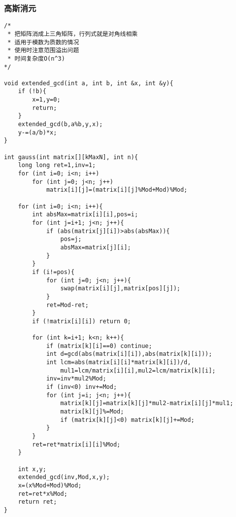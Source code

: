 \subsubsection{高斯消元}
\begin{verbatim}
/*
 * 把矩阵消成上三角矩阵，行列式就是对角线相乘
 * 适用于模数为质数的情况
 * 使用时注意范围溢出问题
 * 时间复杂度O(n^3)
*/

void extended_gcd(int a, int b, int &x, int &y){
    if (!b){
        x=1,y=0;
        return;
    }
    extended_gcd(b,a%b,y,x);
    y-=(a/b)*x;
}

int gauss(int matrix[][kMaxN], int n){
    long long ret=1,inv=1;
    for (int i=0; i<n; i++)
        for (int j=0; j<n; j++)
            matrix[i][j]=(matrix[i][j]%Mod+Mod)%Mod;

    for (int i=0; i<n; i++){
        int absMax=matrix[i][i],pos=i;
        for (int j=i+1; j<n; j++){
            if (abs(matrix[j][i])>abs(absMax)){
                pos=j;
                absMax=matrix[j][i];
            }
        }
        if (i!=pos){
            for (int j=0; j<n; j++){
                swap(matrix[i][j],matrix[pos][j]);
            }
            ret=Mod-ret;
        }
        if (!matrix[i][i]) return 0;
        
        for (int k=i+1; k<n; k++){
            if (matrix[k][i]==0) continue;
            int d=gcd(abs(matrix[i][i]),abs(matrix[k][i]));
            int lcm=abs(matrix[i][i]*matrix[k][i])/d,
				mul1=lcm/matrix[i][i],mul2=lcm/matrix[k][i];
            inv=inv*mul2%Mod;
            if (inv<0) inv+=Mod;
            for (int j=i; j<n; j++){
                matrix[k][j]=matrix[k][j]*mul2-matrix[i][j]*mul1;
                matrix[k][j]%=Mod;
                if (matrix[k][j]<0) matrix[k][j]+=Mod;
            }
        }
        ret=ret*matrix[i][i]%Mod;
    }

    int x,y;
    extended_gcd(inv,Mod,x,y);
    x=(x%Mod+Mod)%Mod;
    ret=ret*x%Mod;
    return ret;
}

\end{verbatim}
